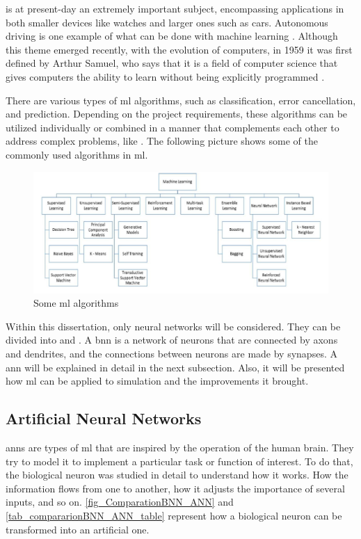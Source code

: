  is at present-day an extremely important subject, encompassing applications in both smaller devices like watches and larger 
ones such as cars.  Autonomous driving is one example of what can be done with machine learning \cite{bachute2021autonomous}. Although this 
theme emerged recently, with the evolution of computers, in 1959 it was first defined by Arthur Samuel, who says that it is a field of computer 
science that gives computers the ability to learn without being explicitly programmed \cite{samuel1959some}. 

There are various types of \gls{ml} algorithms, such as classification, error cancellation, and prediction. Depending on the project 
requirements, these algorithms can be utilized individually or combined in a manner that complements each other to address complex problems, 
like \cite{bachute2021autonomous}. The following picture shows some of the commonly used algorithms in \gls{ml}.

\begin{figure}[H]
	\centering
 	\includegraphics[width=0.9\linewidth]{Images/TypesOfML.png}
 	\caption{Some \gls{ml} algorithms \cite{mahesh2020machine}}
	 \label{fig_TypesOfML}
\end{figure}

Within this dissertation, only neural networks will be considered. They can be divided into  and . 
A \gls{bnn} is a network of neurons that are connected by axons and dendrites, and the connections between neurons are made by synapses. 
A \gls{ann} will be explained in detail in the next subsection. Also, it will be presented how \gls{ml} can be applied to simulation and the 
improvements it brought. 

\subsection{Artificial Neural Networks}

\glspl{ann} are types of \gls{ml} that are inspired by the operation of the human brain. They try to model it to implement a particular task or 
function of interest. To do that, the biological neuron was studied in detail to understand how it works. How the information flows from one 
to another, how it adjusts the importance of several inputs, and so on. \autoref{fig_ComparationBNN_ANN} and 
\autoref{tab_compararionBNN_ANN_table} represent how a biological neuron can be transformed into an artificial one.

